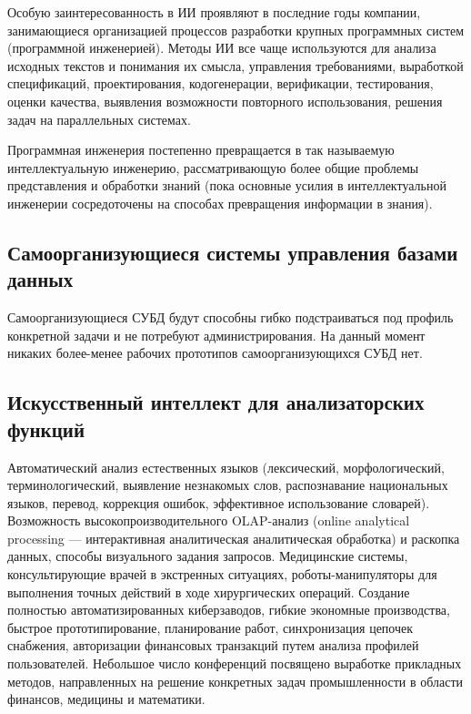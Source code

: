 Особую заинтересованность в ИИ проявляют в последние годы компании, занимающиеся организацией процессов разработки крупных программных систем (программной инженерией). Методы ИИ все чаще используются для анализа исходных текстов и понимания их смысла, управления требованиями, выработкой спецификаций, проектирования, кодогенерации, верификации, тестирования, оценки качества, выявления возможности повторного использования, решения задач на параллельных системах.

Программная инженерия постепенно превращается в так называемую интеллектуальную инженерию, рассматривающую более общие проблемы представления и обработки знаний (пока основные усилия в интеллектуальной инженерии сосредоточены на способах превращения информации в знания).

\subsection{Самоорганизующиеся системы управления базами данных}

Самоорганизующиеся СУБД будут способны гибко подстраиваться под профиль конкретной задачи и не потребуют администрирования. На данный момент никаких более-менее рабочих прототипов самоорганизующихся СУБД нет.

\subsection{Искусственный интеллект для анализаторских функций}

Автоматический анализ естественных языков (лексический, морфологический, терминологический, выявление незнакомых слов, распознавание национальных языков, перевод, коррекция ошибок, эффективное использование словарей). Возможность высокопроизводительного OLAP-анализ (online analytical processing --- интерактивная аналитическая аналитическая обработка) и раскопка данных, способы визуального задания запросов. Медицинские системы, консультирующие врачей в экстренных ситуациях, ро\-бо\-ты-ма\-ни\-пу\-ля\-то\-ры для выполнения точных действий в ходе хирургических операций. Создание полностью автоматизированных киберзаводов, гибкие экономные производства, быстрое прототипирование, планирование работ, синхронизация цепочек снабжения, авторизации финансовых транзакций путем анализа профилей пользователей. Небольшое число конференций посвящено выработке прикладных методов, направленных на решение конкретных задач промышленности в области финансов, медицины и математики.


